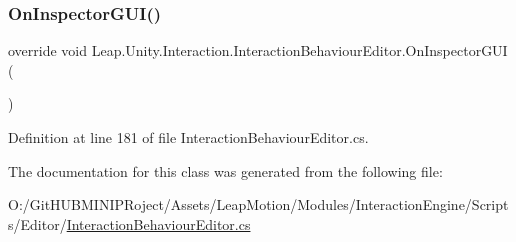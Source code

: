\subsubsection{\texorpdfstring{OnInspectorGUI()}{OnInspectorGUI()}}
{\footnotesize\ttfamily override void Leap.\+Unity.\+Interaction.\+Interaction\+Behaviour\+Editor.\+On\+Inspector\+G\+UI (\begin{DoxyParamCaption}{ }\end{DoxyParamCaption})}



Definition at line 181 of file Interaction\+Behaviour\+Editor.\+cs.



The documentation for this class was generated from the following file\+:\begin{DoxyCompactItemize}
\item 
O\+:/\+Git\+H\+U\+B\+M\+I\+N\+I\+P\+Roject/\+Assets/\+Leap\+Motion/\+Modules/\+Interaction\+Engine/\+Scripts/\+Editor/\mbox{\hyperlink{_interaction_behaviour_editor_8cs}{Interaction\+Behaviour\+Editor.\+cs}}\end{DoxyCompactItemize}
